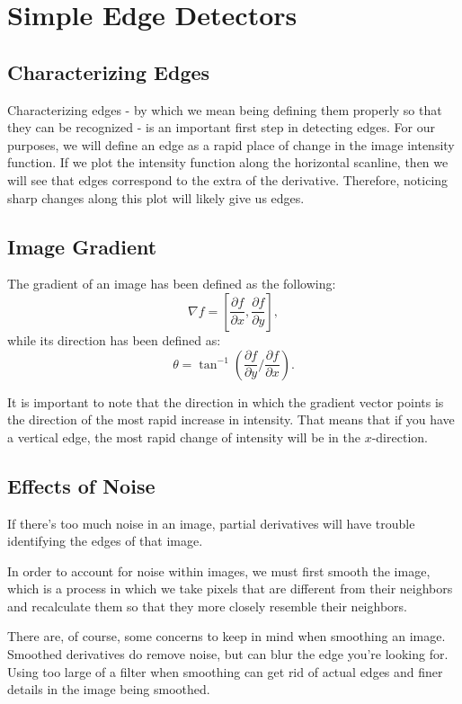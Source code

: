 \documentclass{article}
\begin{document}
\section{Simple Edge Detectors}

\subsection{Characterizing Edges}
Characterizing edges - by which we mean being defining them properly so that they can be recognized - is an important first step in detecting edges. For our purposes, we will define an edge as a rapid place of change in the image intensity function. If we plot the intensity function along the horizontal scanline, then we will see that edges correspond to the extra of the derivative. Therefore, noticing sharp changes along this plot will likely give us edges.


\subsection{Image Gradient}
The gradient of an image has been defined as the following:
$$\nabla f = \left[ \frac{\partial f}{\partial x}, \frac{\partial f}{\partial y}\right],$$
while its direction has been defined as:
$$\theta = \tan^{-1} \left( \frac{\partial f}{\partial y} / \frac{\partial f}{\partial x} \right).$$


It is important to note that the direction in which the gradient vector points is the direction of the most rapid increase in intensity. That means that if you have a vertical edge, the most rapid change of intensity will be in the $x$-direction.


\subsection{Effects of Noise}

If there's too much noise in an image, partial derivatives will have trouble identifying the edges of that image. \newline


In order to account for noise within images, we must first smooth the image, which is a process in which we take pixels that are different from their neighbors and recalculate them so that they more closely resemble their neighbors. \newline

There are, of course, some concerns to keep in mind when smoothing an image. Smoothed derivatives do remove noise, but can blur the edge you're looking for. Using too large of a filter when smoothing can get rid of actual edges and finer details in the image being smoothed.
\end{document}
